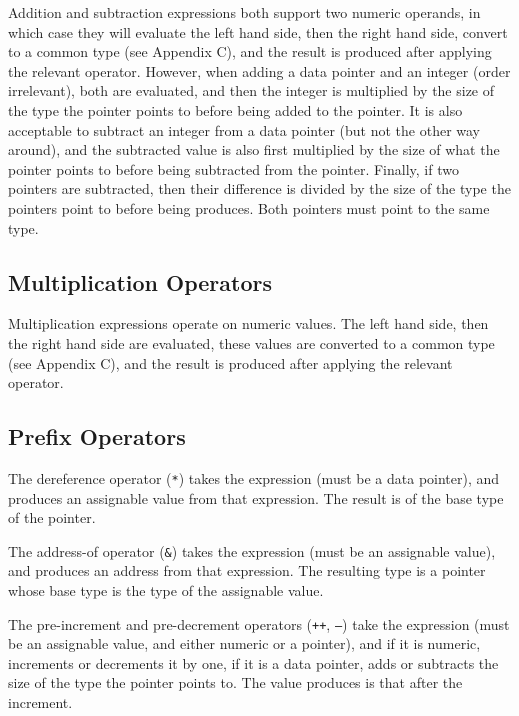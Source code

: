 \documentclass[letterpaper,12pt]{book}
\begin{document}
Addition and subtraction expressions both support two numeric operands, in which case they will evaluate the left hand side, then the right hand side, convert to a common type (see Appendix C), and the result is produced after applying the relevant operator. However, when adding a data pointer and an integer (order irrelevant), both are evaluated, and then the integer is multiplied by the size of the type the pointer points to before being added to the pointer. It is also acceptable to subtract an integer from a data pointer (but not the other way around), and the subtracted value is also first multiplied by the size of what the pointer points to before being subtracted from the pointer. Finally, if two pointers are subtracted, then their difference is divided by the size of the type the pointers point to before being produces. Both pointers must point to the same type.

\subsection{Multiplication Operators}



Multiplication expressions operate on numeric values. The left hand side, then the right hand side are evaluated, these values are converted to a common type (see Appendix C), and the result is produced after applying the relevant operator.

\subsection{Prefix Operators}



The dereference operator (\texttt{*}) takes the expression (must be a data pointer), and produces an assignable value from that expression. The result is of the base type of the pointer.

The address-of operator (\texttt{\&}) takes the expression (must be an assignable value), and produces an address from that expression. The resulting type is a pointer whose base type is the type of the assignable value.

The pre-increment and pre-decrement operators (\texttt{++}, \texttt{--}) take the expression (must be an assignable value, and either numeric or a pointer), and if it is numeric, increments or decrements it by one, if it is a data pointer, adds or subtracts the size of the type the pointer points to. The value produces is that after the increment.
\end{document}
